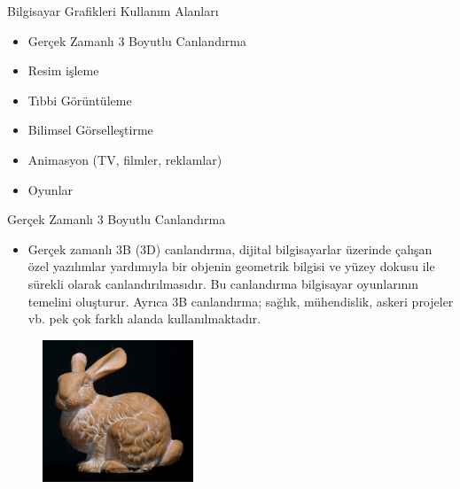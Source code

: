 \documentclass{beamer}
\begin{document}
\begin{frame}{Bilgisayar Grafikleri Kullanım Alanları}
\begin{itemize}
    \item Gerçek Zamanlı 3 Boyutlu Canlandırma
    \item Resim işleme
    \item Tıbbi Görüntüleme
    \item Bilimsel Görselleştirme
    \item Animasyon (TV, filmler, reklamlar)
    \item Oyunlar
\end{itemize}
    
\end{frame}

\begin{frame}{Gerçek Zamanlı 3 Boyutlu Canlandırma}
\begin{itemize}
    \item Gerçek zamanlı 3B (3D) canlandırma, dijital bilgisayarlar üzerinde çalışan özel yazılımlar yardımıyla bir objenin geometrik bilgisi ve yüzey dokusu ile sürekli olarak canlandırılmasıdır. Bu canlandırma bilgisayar oyunlarının temelini oluşturur. Ayrıca 3B canlandırma; sağlık, mühendislik, askeri projeler vb. pek çok farklı alanda kullanılmaktadır.\cite{ebergi}
\end{itemize}
\begin{figure}
\includegraphics[width=0.4\textwidth]{3btest.PNG}
\caption{}
\end{figure}
    
\end{frame}
\end{document}
